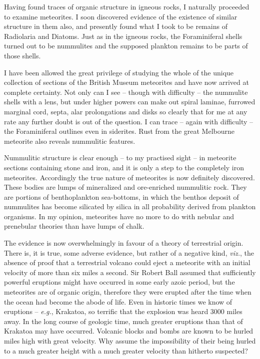 \documentclass[a4paper, 12pt, oneside]{article}
\begin{document}
Having found traces of organic structure in igneous rocks, I naturally proceeded to examine meteorites. I soon discovered evidence of the existence of similar structure in them also, and presently found what I took to be remains of Radiolaria and Diatoms. Just as in the igneous rocks, the Foraminiferal shells turned out to be nummulites and the supposed plankton remains to be parts of those shells.

I have been allowed the great privilege of studying the whole of the unique collection of sections of the British Museum meteorites and have now arrived at complete certainty. Not only can I see -- though with difficulty -- the nummulite shells with a lens, but under higher powers can make out spiral laminae, furrowed marginal cord, septa, alar prolongations and disks so clearly that for me at any rate any further doubt is out of the question. I can trace -- again with difficulty -- the Foraminiferal outlines even in siderites. Rust from the great Melbourne meteorite also reveals nummulitic features.

Nummulitic structure is clear enough -- to my practised sight -- in meteorite sections containing stone and iron, and it is only a step to the completely iron meteorites. Accordingly the true nature of meteorites is now definitely discovered. These bodies are lumps of mineralized and ore-enriched nummulitic rock. They are portions of benthoplankton sea-bottoms, in which the benthos deposit of nummulites has become silicated by silica in all probability derived from plankton organisms. In my opinion, meteorites have no more to do with nebular and prenebular theories than have lumps of chalk.

The evidence is now overwhelmingly in favour of a theory of terrestrial origin. There is, it is true, some adverse evidence, but rather of a negative kind, \emph{viz.}, the absence of proof that a terrestrial volcano could eject a meteorite with an initial velocity of more than six miles a second. Sir Robert Ball assumed that sufficiently powerful eruptions might have occurred in some early azoic period, but the meteorites are of organic origin, therefore they were erupted after the time when the ocean had become the abode of life. Even in historic times we know of eruptions -- \emph{e.g.}, Krakatoa, so terrific that the explosion was heard 3000 miles away. In the long course of geologic time, much greater eruptions than that of Krakatoa may have occurred. Volcanic blocks and bombs are known to be hurled miles high with great velocity. Why assume the impossibility of their being hurled to a much greater height with a much greater velocity than hitherto suspected?
\end{document}
